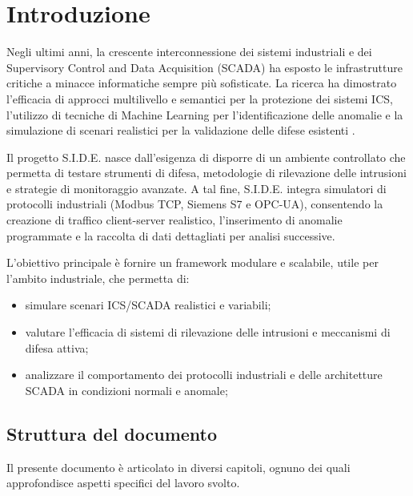 \chapter{Introduzione}

Negli ultimi anni, la crescente interconnessione dei sistemi industriali e dei Supervisory Control and Data Acquisition (SCADA) ha esposto le infrastrutture critiche a minacce informatiche sempre più sofisticate.  
La ricerca ha dimostrato l’efficacia di approcci multilivello e semantici per la protezione dei sistemi ICS, l’utilizzo di tecniche di Machine Learning per l’identificazione delle anomalie e la simulazione di scenari realistici per la validazione delle difese esistenti \cite{simulationImplementationSecurityServices, diderotIds, semanticSecurityAnalysisScadaNetwork, graphBasedActiveCyberDefense}.

Il progetto S.I.D.E. nasce dall’esigenza di disporre di un ambiente controllato che permetta di testare strumenti di difesa, metodologie di rilevazione delle intrusioni e strategie di monitoraggio avanzate.  
A tal fine, S.I.D.E. integra simulatori di protocolli industriali (Modbus TCP, Siemens S7 e OPC-UA), consentendo la creazione di traffico client-server realistico, l’inserimento di anomalie programmate e la raccolta di dati dettagliati per analisi successive.

L’obiettivo principale è fornire un framework modulare e scalabile, utile per l'ambito industriale, che permetta di:
\begin{itemize}
    \item simulare scenari ICS/SCADA realistici e variabili;
    \item valutare l’efficacia di sistemi di rilevazione delle intrusioni e meccanismi di difesa attiva;
    \item analizzare il comportamento dei protocolli industriali e delle architetture SCADA in condizioni normali e anomale;
\end{itemize}

\section{Struttura del documento}
Il presente documento è articolato in diversi capitoli, ognuno dei quali approfondisce aspetti specifici del lavoro svolto.

